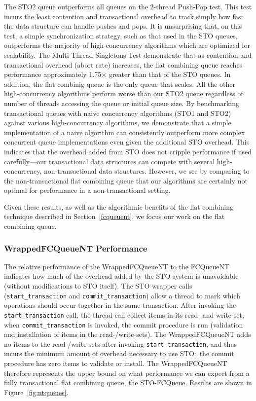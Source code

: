 The STO2 queue outperforms all queues on the 2-thread Push-Pop test. This test incurs the least contention and transactional overhead to track simply how fast the data structure can handle pushes and pops. It is unsurprising that, on this test, a simple synchronization strategy, such as that used in the STO queues, outperforms the majority of high-concurrency algorithms which are optimized for scalability. The Multi-Thread Singletons Test demonstrate that as contention and transactional overhead (abort rate) increases, the flat combining queue reaches performance approximately 1.75$\times$ greater than that of the STO queues. In addition, the flat combinig queue is the only queue that scales. All the other high-concurrency algorithms perform worse than our STO2 queue regardless of number of threads accessing the queue or initial queue size.
By benchmarking transactional queues with naive concurrency algorithms (STO1 and STO2) against various high-concurrency algorithms, we demonstrate that a simple implementation of a naive algorithm can consistently outperform more complex concurrent queue implementations even given the additional STO overhead. This indicates that the overhead added from STO does not cripple performance if used carefully---our transactional data structures can compete with several high-concurrency, non-transactional data structures. However, we see by comparing to the non-transactional flat combining queue that our algorithms are certainly not optimal for performance in a non-transactional setting.

Given these results, as well as the algorithmic benefits of the flat combining technique described in Section~\ref{fcqueuent}, we focus our work on the flat combining queue.


\subsubsection{WrappedFCQueueNT Performance}
The relative performance of the WrappedFCQueueNT to the FCQueueNT indicates how much of the overhead added by the STO system is unavoidable (without modifications to STO itself). The STO wrapper calls (\texttt{start\_transaction} and \texttt{commit\_transaction}) allow a thread to mark which operations should occur together in the same transaction. After invoking the \texttt{start\_transaction} call, the thread can collect items in its read- and write-set; when \texttt{commit\_transaction} is invoked, the commit procedure is run (validation and installation of items in the read-/write-sets). The WrappedFCQueueNT adds no items to the read-/write-sets after invoking \texttt{start\_transaction}, and thus incurs the minimum amount of overhead necessary to use STO:\ the commit procedure has zero items to validate or install. The WrappedFCQueueNT therefore represents the upper bound on what performance we can expect from a fully transactional flat combining queue, the STO-FCQueue. 
Results are shown in Figure~\ref{fig:ntqueues}. 

